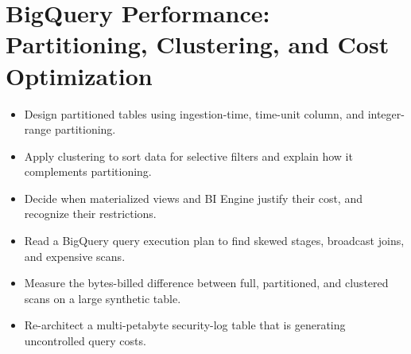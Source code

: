 \chapter{BigQuery Performance: Partitioning, Clustering, and Cost Optimization}

\begin{objectives}
\begin{itemize}
    \item Design partitioned tables using ingestion-time, time-unit column, and integer-range partitioning.
    \item Apply clustering to sort data for selective filters and explain how it complements partitioning.
    \item Decide when materialized views and BI Engine justify their cost, and recognize their restrictions.
    \item Read a BigQuery query execution plan to find skewed stages, broadcast joins, and expensive scans.
    \item Measure the bytes-billed difference between full, partitioned, and clustered scans on a large synthetic table.
    \item Re-architect a multi-petabyte security-log table that is generating uncontrolled query costs.
\end{itemize}
\end{objectives}

